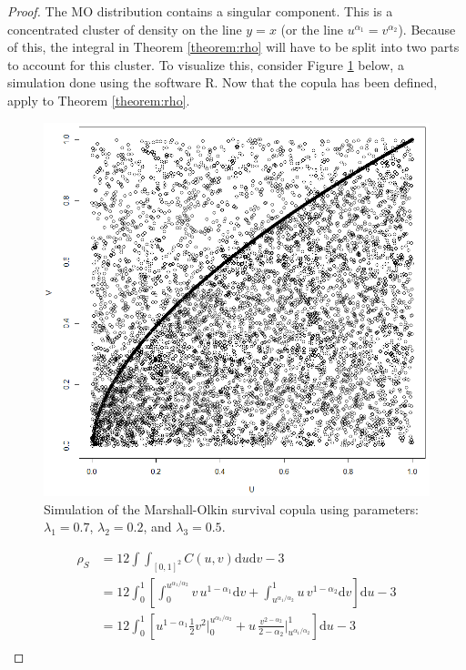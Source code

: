\begin{proof}
    The MO distribution contains a singular component. This is a concentrated cluster of density on the line $y=x$ (or the line $u^{\alpha_1}=v^{\alpha_2}$). Because of this, the integral in Theorem \ref{theorem:rho} will have to be split into two parts to account for this cluster. To visualize this, consider Figure \ref{fig:MOsim} below, a simulation done using the software R. Now that the copula has been defined, apply to Theorem \ref{theorem:rho}.
    \begin{figure}
        \centering
        \includegraphics[scale=0.6]{images/MOsimulation.PNG}
        \caption{Simulation of the Marshall-Olkin survival copula using parameters: $\lambda_1=0.7$, $\lambda_2=0.2$, and $\lambda_3=0.5$.}
        \label{fig:MOsim}
    \end{figure}
    \begin{align*}
        \rho_S&=12\int\int_{[0,1]^2}C\left(u,v\right)\mathrm{d}u\mathrm{d}v-3\\
        &=12\int_0^1\left[\int_0^{u^{\alpha_1/\alpha_2}}v\, u^{1-\alpha_1}\mathrm{d}v+\int_{u^{\alpha_1/\alpha_2}}^1u\, v^{1-\alpha_2}\mathrm{d}v\right]\mathrm{d}u-3\\
        &=12\int_0^1\left[u^{1-\alpha_1}\frac{1}{2}v^2\bigg|_0^{u^{\alpha_1/\alpha_2}}+u\, \frac{v^{2-\alpha_2}}{2-\alpha_2}\bigg|_{u^{\alpha_1/\alpha_2}}^1\right]\mathrm{d}u-3\\

\end{align*}
\end{proof}
